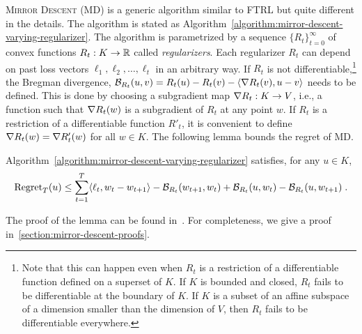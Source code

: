\textsc{Mirror Descent} (MD) is a generic algorithm similar to \textsc{FTRL}
but quite different in the details. The algorithm is stated as
Algorithm~\ref{algorithm:mirror-descent-varying-regularizer}. The algorithm is
parametrized by a sequence $\{R_t\}_{t=0}^\infty$ of convex functions $R_t:K
\to \mathbb{R}$ called \emph{regularizers}. Each regularizer $R_t$ can depend on past
loss vectors $\ell_1, \ell_2, \dots, \ell_t$ in an arbitrary way. If $R_t$ is
not differentiable,\footnote{Note that this can happen even when $R_t$ is a
restriction of a differentiable function defined on a superset of $K$.  If $K$
is bounded and closed, $R_t$ fails to be differentiable at the boundary of $K$.
If $K$ is a subset of an affine subspace of a dimension smaller than the
dimension of $V$, then $R_t$ fails to be differentiable everywhere.} the
Bregman divergence, $\mathcal{B}_{R_t}(u,v) = R_t(u) - R_t(v) - \langle \nabla R_t(v),
u - v \rangle$ needs to be defined. This is done by choosing a subgradient map
$\nabla R_t:K \to V$, i.e., a function such that $\nabla R_t(w)$ is a subgradient
of $R_t$ at any point $w$. If $R_t$ is a restriction of a differentiable function
$R'_t$, it is convenient to define $\nabla R_t(w) = \nabla R'_t(w)$ for all $w
\in K$. The following lemma bounds the regret of \textsc{MD}.

\begin{lemma}
\label{lemma:mirror-descent-regret}
Algorithm~\ref{algorithm:mirror-descent-varying-regularizer} satisfies, for any
$u \in K$,
$$
\operatorname{Regret}_T(u)
\le
\sum_{t=1}^T \langle \ell_t, w_t - w_{t+1} \rangle - \mathcal{B}_{R_t}(w_{t+1}, w_t) + \mathcal{B}_{R_t}(u,w_t) - \mathcal{B}_{R_t}(u, w_{t+1}) \; .
$$
\end{lemma}

The proof of the lemma can be found
in~\cite{Rakhlin-Sridharan-2009,Duchi-Shalev-Shwartz-Singer-Tewari-2010}.  For
completeness, we give a proof in~\ref{section:mirror-descent-proofs}.


